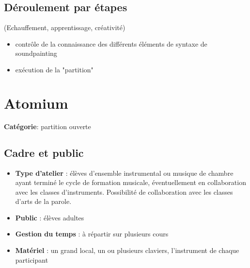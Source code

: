 \documentclass[a4paper,11pt,bibliography=totoc,numbers=noenddot,listof=flat,DIV=11,BCOR=0mm]{scrreprt}%
\begin{document}

\section*{Déroulement par étapes}
(Echauffement, apprentissage, créativité)
\begin{itemize}
\item contrôle de la connaissance des différents éléments de syntaxe de soundpainting
\item exécution de la "partition"
\end{itemize}









\chapter[Partition ouverte: Atomium]{Atomium}
{\large \textbf{Catégorie}}:
partition ouverte

\section*{Cadre et public}
\begin{itemize}
\item [\textbullet]\textbf{Type d'atelier} : élèves d'ensemble instrumental ou musique de chambre ayant terminé le cycle de formation musicale, éventuellement en collaboration avec les classes d'instruments. Possibilité de collaboration avec les classes d'arts de la parole.

\item [\textbullet]\textbf{Public} : élèves adultes

\item [\textbullet]\textbf{Gestion du temps} : à répartir sur plusieurs cours

\item [\textbullet]\textbf{Matériel} : un grand local, un ou plusieurs claviers, l'instrument de chaque participant
\end{itemize}
\end{document}
